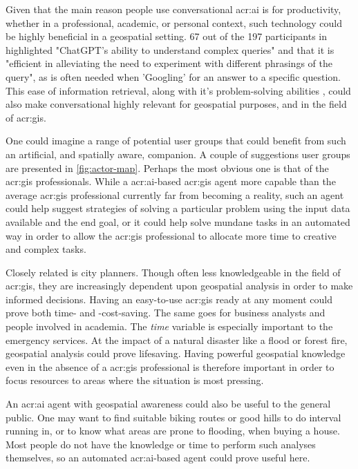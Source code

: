 Given that the main reason people use conversational \acrshort{acr:ai} is for productivity, whether in a professional, academic, or personal context, such technology could be highly beneficial in a geospatial setting. 67 out of the 197 participants in \cite[18]{skjuveWhyPeopleUse2023} highlighted "ChatGPT's ability to understand complex queries" and that it is "efficient in alleviating the need to experiment with different phrasings of the query", as is often needed when 'Googling' for an answer to a specific question. This ease of information retrieval, along with it's problem-solving abilities \citep[20]{skjuveWhyPeopleUse2023}, could also make conversational  highly relevant for geospatial purposes, and in the field of \acrshort{acr:gis}.

One could imagine a range of potential user groups that could benefit from such an artificial, and spatially aware, companion. A couple of suggestions user groups are presented in \autoref{fig:actor-map}. Perhaps the most obvious one is that of the \acrshort{acr:gis} professionals. While a \acrshort{acr:ai}-based \acrshort{acr:gis} agent more capable than the average \acrshort{acr:gis} professional currently far from becoming a reality, such an agent could help suggest strategies of solving a particular problem using the input data available and the end goal, or it could help solve mundane tasks in an automated way in order to allow the \acrshort{acr:gis} professional to allocate more time to creative and complex tasks.

Closely related is city planners. Though often less knowledgeable in the field of \acrshort{acr:gis}, they are increasingly dependent upon geospatial analysis in order to make informed decisions. Having an easy-to-use \acrshort{acr:gis} ready at any moment could prove both time- and -cost-saving. The same goes for business analysts and people involved in academia. The \textit{time} variable is especially important to the emergency services. At the impact of a natural disaster like a flood or forest fire, geospatial analysis could prove lifesaving. Having powerful geospatial knowledge even in the absence of a \acrshort{acr:gis} professional is therefore important in order to focus resources to areas where the situation is most pressing.

An \acrshort{acr:ai} agent with geospatial awareness could also be useful to the general public. One may want to find suitable biking routes or good hills to do interval running in, or to know what areas are prone to flooding, when buying a house. Most people do not have the knowledge or time to perform such analyses themselves, so an automated \acrshort{acr:ai}-based agent could prove useful here.



